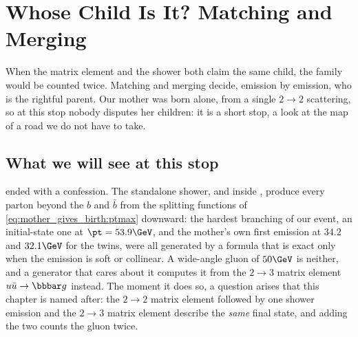 \chapter{Whose Child Is It? Matching and Merging}
\label{ch:whose_child}

\begin{journeybox}
When the matrix element and the shower both claim the same child, the family
would be counted twice. Matching and merging decide, emission by emission,
who is the rightful parent. Our mother was born alone, from a single
$2\to2$ scattering, so at this stop nobody disputes her children: it is a
short stop, a look at the map of a road we do not have to take.
\end{journeybox}


\section{What we will see at this stop}
\label{sec:whose_child:what_we_compute}
\label{sec:whose_child:why_short}

 ended with a confession. The standalone shower,
and \PYTHIA inside \CMSSW, produce every parton beyond the $b$ and $\bar b$
from the splitting functions of \cref{eq:mother_gives_birth:ptmax} downward:
the hardest branching of our event, an initial-state one at
$\pt=53.9\GeV$, and the mother's own first emission at $34.2$ and $32.1\GeV$
for the twins, were all generated by a formula that is exact only when the
emission is soft or collinear. A wide-angle gluon of $50\GeV$ is neither,
and a generator that cares about it computes it from the $2\to3$ matrix
element $u\bar u\to\bbbar g$ instead. The moment it does so, a question
arises that this chapter is named after: the $2\to2$ matrix element followed
by one shower emission and the $2\to3$ matrix element describe the \emph{same}
final state, and adding the two counts the gluon twice.

